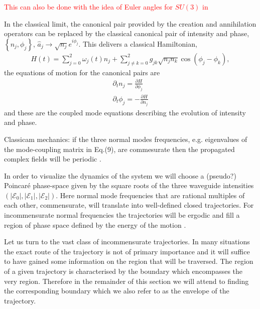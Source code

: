 \documentclass[9pt,twocolumn,twoside]{osajnl}
\begin{document}
\textcolor{red}{This can also be done with the idea of Euler angles for $SU(3)$ in \cite{Nelson1967p857}}

In the classical limit, the canonical pair provided by the creation and annihilation operators can be replaced by the classical canonical pair of intensity and phase, $\left\{ n_{j}, \phi_{j} \right\}$, $ \hat{a}_{j} \rightarrow \sqrt{n_{j}}e^{i \phi_{j}}$. 
This delivers a classical Hamiltonian, 
\begin{eqnarray}\label{eq:clHamiltonian}
H(t) = \sum_{j=0}^{2} \omega_{j}(t) n_{j}  
	+ \sum_{j \neq k = 0}^{2} g_{jk} \sqrt{n_{j} n_{k}} \cos \left( \phi_{j} - \phi_{k} \right),
\end{eqnarray}
the equations of motion for the canonical pairs are 
\begin{eqnarray}
\partial_t n_j = \frac{\partial H}{\partial \phi_j}\\
\partial_t \phi_j = - \frac{\partial H}{\partial n_j}  
\end{eqnarray}
and these are the coupled mode equations describing the evolution of intensity and phase.

Classicam mechanics: if the three normal modes frequencies, e.g. eigenvalues of the mode-coupling matrix in Eq.(9), are commesurate then the propagated complex fields will be periodic \cite{Goldstein1980}. 

In order to visualize the dynamics of the system we will choose a (pseudo?) Poincar\'e phase-space given by the square roots of the three waveguide intensities $(\vert \mathcal{E}_{0} \vert,\vert \mathcal{E}_{1} \vert,\vert \mathcal{E}_{2} \vert )$.
Here  normal mode frequencies that are rational multiples of each other, commensurate, will translate into well-defined closed trajectories. For incommensurate normal frequencies the trajectories will be ergodic and fill a region of phase space defined by the energy of the motion \cite{Goldstein1980}.

Let us turn to the vast class of incommensurate trajectories. In many situations the exact route 
of the trajectory is not of primary importance and 
it will suffice to have gained some information on the region that will be traversed. The region 
of a given trajectory is characterised by the 
boundary which encompasses the very region. Therefore in the remainder of this section we will 
attend to finding the corresponding boundary which we also refer to as the envelope of the trajectory.   
\end{document}
